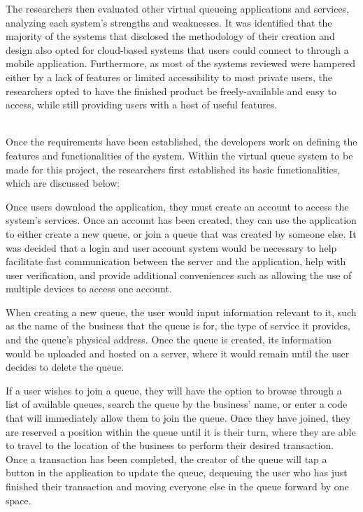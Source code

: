 The researchers then evaluated other virtual queueing applications and services, analyzing each system’s strengths and weaknesses. It was identified that the majority of the systems that disclosed the methodology of their creation and design also opted for cloud-based systems that users could connect to through a mobile application. Furthermore, as most of the systems reviewed were hampered either by a lack of features or limited accessibility to most private users, the researchers opted to have the finished product be freely-available and easy to access, while still providing users with a host of useful features. 

 \\
Once the requirements have been established, the developers work on defining the features and functionalities of the system. Within the virtual queue system to be made for this project, the researchers first established its basic functionalities, which are discussed below:

Once users download the application, they must create an account to access the system’s services. Once an account has been created, they can use the application to either create a new queue, or join a queue that was created by someone else. It was decided that a login and user account system would be necessary to help facilitate fast communication between the server and the application, help with user verification, and provide additional conveniences such as allowing the use of multiple devices to access one account.

When creating a new queue, the user would input information relevant to it, such as the name of the business that the queue is for, the type of service it provides, and the queue’s physical address. Once the queue is created, its information would be uploaded and hosted on a server, where it would remain until the user decides to delete the queue. 

If a user wishes to join a queue, they will have the option to browse through a list of available queues, search the queue by the business’ name, or enter a code that will immediately allow them to join the queue. Once they have joined, they are reserved a position within the queue until it is their turn, where they are able to travel to the location of the business to perform their desired transaction. Once a transaction has been completed, the creator of the queue will tap a button in the application to update the queue, dequeuing the user who has just finished their transaction and moving everyone else in the queue forward by one space.

